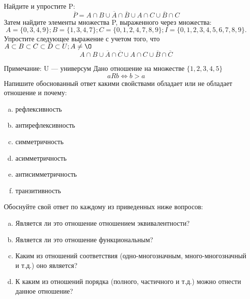 \documentclass[10pt]{exam}
\begin{document}
\begin{questions}
\question
Найдите и упростите P:
\begin{equation*}
\overline{P} = A \cap B \cup \overline{A} \cap \overline{B} \cup A \cap C \cup \overline{B} \cap C
\end{equation*}
Затем найдите элементы множества P, выраженного через множества:
\begin{equation*}
A = \{0, 3, 4, 9\}; 
B = \{1, 3, 4, 7\};
C = \{0, 1, 2, 4, 7, 8, 9\};
I = \{0, 1, 2, 3, 4, 5, 6, 7, 8, 9\}.
\end{equation*}\question
Упростите следующее выражение с учетом того, что $A\subset B \subset C \subset D \subset U; A \neq \O$
\begin{equation*}
A \cap B \cup \overline{A} \cap \overline{C} \cup A \cap C \cup \overline{B} \cap \overline{C}
\end{equation*}

Примечание: U — универсум\question
Дано отношение на множестве $\{1, 2, 3, 4, 5\}$ 
\begin{equation*}
aRb \iff b > a
\end{equation*}
Напишите обоснованный ответ какими свойствами обладает или не обладает отношение и почему:   
\begin{enumerate} [a)]\setcounter{enumi}{0}
\item рефлексивность
\item антирефлексивность
\item симметричность
\item асимметричность
\item антисимметричность
\item транзитивность
\end{enumerate}

Обоснуйте свой ответ по каждому из приведенных ниже вопросов:
\begin{enumerate} [a)]\setcounter{enumi}{0}
    \item Является ли это отношение отношением эквивалентности?
    \item Является ли это отношение функциональным?
    \item Каким из отношений соответствия (одно-многозначным, много-многозначный и т.д.) оно является?
    \item К каким из отношений порядка (полного, частичного и т.д.) можно отнести данное отношение?
\end{enumerate}


\end{questions}
\end{document}
